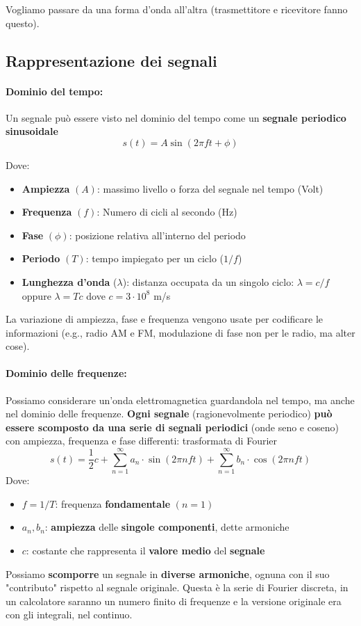 Vogliamo passare da una forma d'onda all'altra (trasmettitore e ricevitore fanno questo). \\

\newpage

\subsection{Rappresentazione dei segnali}

\paragraph{Dominio del tempo:} Un segnale può essere visto nel dominio del tempo come un \textbf{segnale periodico sinusoidale}
$$ s(t) = A \sin (2 \pi ft + \phi) $$

Dove: 
\begin{itemize}
	\item \textbf{Ampiezza} $(A)$:	massimo livello o forza del segnale nel tempo (Volt)
	\item \textbf{Frequenza} $(f)$: Numero di cicli al secondo (Hz)
	\item \textbf{Fase} $(\phi)$: posizione relativa all'interno del periodo
	\item \textbf{Periodo} $(T)$: tempo impiegato per un ciclo ($1/f$)
	\item \textbf{Lunghezza d'onda} ($\lambda$): distanza occupata da un singolo ciclo: $\lambda = c/f$ oppure $\lambda = T c$ dove $c = 3\cdot 10^8$ m/s
\end{itemize}
La variazione di ampiezza, fase e frequenza vengono usate per codificare le informazioni (e.g., radio AM e FM, modulazione di fase non per le radio, ma alter cose).

\paragraph{Dominio delle frequenze:} Possiamo considerare un'onda elettromagnetica guardandola nel tempo, ma anche nel dominio delle frequenze. \textbf{Ogni segnale} (ragionevolmente periodico) \textbf{può essere scomposto da una serie di segnali periodici} (onde seno e coseno) con ampiezza, frequenza e fase differenti: trasformata di Fourier
$$ s(t) = \frac{1}{2} c + \sum_{n=1}^{\infty} a_n \cdot \sin (2 \pi n f t) + \sum_{n=1}^{\infty} b_n \cdot \cos (2 \pi n f t) $$
Dove: 
\begin{itemize}
	\item $f=1/T$: frequenza \textbf{fondamentale} $(n=1)$
	\item $a_n, b_n$: \textbf{ampiezza} delle \textbf{singole componenti}, dette armoniche
	\item $c$: costante che rappresenta il \textbf{valore medio} del \textbf{segnale}
\end{itemize}
Possiamo \textbf{scomporre} un segnale in \textbf{diverse armoniche}, ognuna con il suo "contributo" rispetto al segnale originale. Questa è la serie di Fourier discreta, in un calcolatore saranno un numero finito di frequenze e la versione originale era con gli integrali, nel continuo.\\

